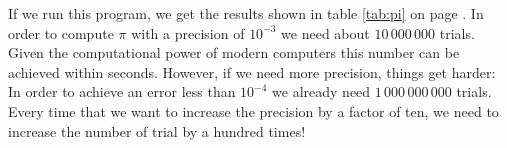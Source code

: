 If we run this program, we get the results shown in table \ref{tab:pi} on page \pageref{tab:pi}.
In order to compute $\pi$ with a precision of $10^{-3}$ we need about $10\,000\,000$ trials.  Given the
computational power of modern computers this number can be achieved within seconds.  However,  if we need more
precision, things get harder:  In order to achieve an error less than  $10^{-4}$ we already need
$1\,000\,000\,000$ trials.  Every time that we want to increase the precision by a factor of ten, we need to
increase the number of trial by a hundred times!


\begin{center}
\colorbox{red}{}
\end{center}


